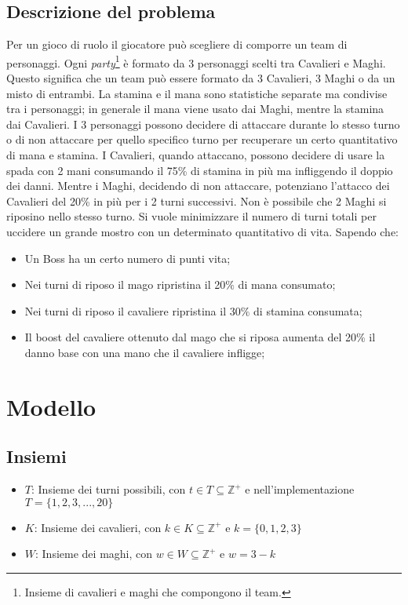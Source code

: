 \documentclass[12pt]{article}
\begin{document}
    \subsection{Descrizione del problema}
    Per un gioco di ruolo il giocatore può scegliere di comporre un team di personaggi.
    Ogni \textit{party}\footnote{Insieme di cavalieri e maghi che compongono il team.} è formato da 3 personaggi scelti tra Cavalieri e Maghi. Questo significa che un team può essere formato da 3 Cavalieri, 3 Maghi o da un misto di entrambi. 
    La stamina e il mana sono statistiche separate ma condivise tra i personaggi; in generale
    il mana viene usato dai Maghi, mentre la stamina dai Cavalieri.
    I 3 personaggi possono decidere di attaccare durante lo stesso turno o di non attaccare per quello specifico turno per recuperare un certo quantitativo di mana e stamina.
    I Cavalieri, quando attaccano, possono decidere di usare la spada con 2 mani consumando il 75\% di stamina in più ma infliggendo il doppio dei danni. Mentre i Maghi, decidendo di non attaccare, potenziano l'attacco dei Cavalieri del 20\% in più per i 2 turni successivi. Non è possibile che 2 Maghi si riposino nello stesso turno. Si vuole minimizzare il numero di turni totali per uccidere un grande mostro con un determinato quantitativo di vita. Sapendo che:
    \begin{itemize}
        \item Un Boss ha un certo numero di punti vita;
        \item Nei turni di riposo il mago ripristina il 20$\%$ di mana consumato;
        \item Nei turni di riposo il cavaliere ripristina il 30$\%$ di stamina consumata;
        \item Il boost del cavaliere ottenuto dal mago che si riposa aumenta del 20$\%$ il danno base con una mano che il cavaliere infligge;
    \end{itemize}

    \section{Modello}
    \subsection{Insiemi}
    \begin{itemize}
        \item $T$: Insieme dei turni possibili, con $t \in T \subseteq \mathbb{Z}^+$ e nell'implementazione $T = \{1,2,3,...,20\}$
        \item $K$: Insieme dei cavalieri, con $k \in K \subseteq \mathbb{Z}^+$ e $k = \{ 0,1,2,3 \}$
        \item $W$: Insieme dei maghi, con $w \in W \subseteq \mathbb{Z}^+$ e $w = 3- k$
    \end{itemize}
\end{document}
